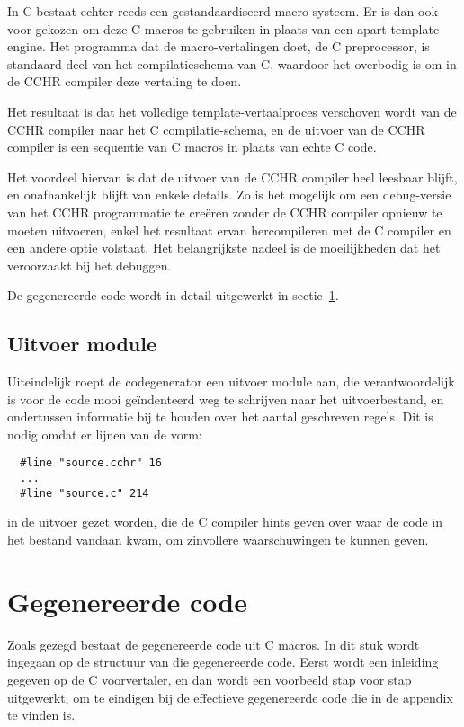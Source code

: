 In C bestaat echter reeds een gestandaardiseerd macro-systeem. Er is dan ook voor gekozen om deze C macros te gebruiken in plaats van een apart template engine. Het programma dat de macro-vertalingen doet, de C preprocessor, is standaard deel van het compilatieschema van C, waardoor het overbodig is om in de CCHR compiler deze vertaling te doen.

Het resultaat is dat het volledige template-vertaalproces verschoven wordt van de CCHR compiler naar het C compilatie-schema, en de uitvoer van de CCHR compiler is een sequentie van C macros in plaats van echte C code.

Het voordeel hiervan is dat de uitvoer van de CCHR compiler heel leesbaar blijft, en onafhankelijk blijft van enkele details. Zo is het mogelijk om een debug-versie van het CCHR programmatie te cre\"eren zonder de CCHR compiler opnieuw te moeten uitvoeren, enkel het resultaat ervan hercompileren met de C compiler en een andere optie volstaat. Het belangrijkste nadeel is de moeilijkheden dat het veroorzaakt bij het debuggen.

De gegenereerde code wordt in detail uitgewerkt in sectie~\ref{sec:gencode}.

\subsection{Uitvoer module} \label{sec:uitvoer}

Uiteindelijk roept de codegenerator een uitvoer module aan, die verantwoordelijk is voor de code mooi ge\"indenteerd weg te schrijven naar het uitvoerbestand, en ondertussen informatie bij te houden over het aantal geschreven regels. Dit is nodig omdat er lijnen van de vorm: \begin{Verbatim}
  #line "source.cchr" 16
  ...
  #line "source.c" 214
\end{Verbatim}
in de uitvoer gezet worden, die de C compiler hints geven over waar de code in het bestand vandaan kwam, om zinvollere waarschuwingen te kunnen geven. 

\section{Gegenereerde code} \label{sec:gencode}

Zoals gezegd bestaat de gegenereerde code uit C macros. In dit stuk wordt ingegaan op de structuur van die gegenereerde code. Eerst wordt een inleiding gegeven op de C voorvertaler, en dan wordt een voorbeeld stap voor stap uitgewerkt, om te eindigen bij de effectieve gegenereerde code die in de appendix te vinden is.

